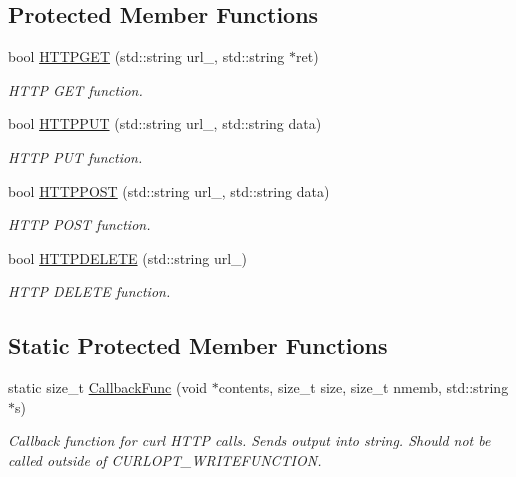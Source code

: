 \subsection*{Protected Member Functions}
\begin{DoxyCompactItemize}
\item 
bool \hyperlink{class_couch_d_b_a71bc84918bdd964da859a844ef00fe11}{H\+T\+T\+P\+G\+ET} (std\+::string url\+\_\+, std\+::string $\ast$ret)
\begin{DoxyCompactList}\small\item\em H\+T\+TP G\+ET function. \end{DoxyCompactList}\item 
bool \hyperlink{class_couch_d_b_a51e32342b653c055a19602a716f2fb7c}{H\+T\+T\+P\+P\+UT} (std\+::string url\+\_\+, std\+::string data)
\begin{DoxyCompactList}\small\item\em H\+T\+TP P\+UT function. \end{DoxyCompactList}\item 
bool \hyperlink{class_couch_d_b_a1aa5d75023ff39b9ebf04b1dbee500f3}{H\+T\+T\+P\+P\+O\+ST} (std\+::string url\+\_\+, std\+::string data)
\begin{DoxyCompactList}\small\item\em H\+T\+TP P\+O\+ST function. \end{DoxyCompactList}\item 
bool \hyperlink{class_couch_d_b_ab4bb23537894cbc90adfc736fad836a0}{H\+T\+T\+P\+D\+E\+L\+E\+TE} (std\+::string url\+\_\+)
\begin{DoxyCompactList}\small\item\em H\+T\+TP D\+E\+L\+E\+TE function. \end{DoxyCompactList}\end{DoxyCompactItemize}
\subsection*{Static Protected Member Functions}
\begin{DoxyCompactItemize}
\item 
static size\+\_\+t \hyperlink{class_couch_d_b_a6216c074f7062f4098e7ab3e848a6c3d}{Callback\+Func} (void $\ast$contents, size\+\_\+t size, size\+\_\+t nmemb, std\+::string $\ast$s)
\begin{DoxyCompactList}\small\item\em Callback function for curl H\+T\+TP calls. Sends output into string. Should not be called outside of C\+U\+R\+L\+O\+P\+T\+\_\+\+W\+R\+I\+T\+E\+F\+U\+N\+C\+T\+I\+ON. \end{DoxyCompactList}\end{DoxyCompactItemize}
